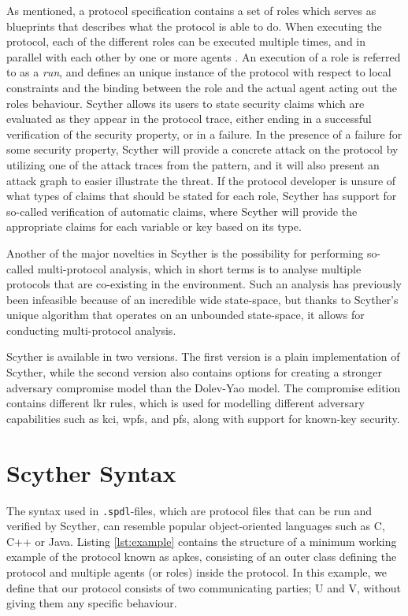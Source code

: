 As mentioned, a protocol specification contains a set of roles which serves as blueprints that describes what the protocol is able to do. When executing the protocol, each of the different roles can be executed multiple times, and in parallel with each other by one or more agents \cite{cremers2006scyther}. An execution of a role is referred to as a \emph{run}, and defines an unique instance of the protocol with respect to local constraints and the binding between the role and the actual agent acting out the roles behaviour. Scyther allows its users to state security claims which are evaluated as they appear in the protocol trace, either ending in a successful verification of the security property, or in a failure. In the presence of a failure for some security property, Scyther will provide a concrete attack on the protocol by utilizing one of the attack traces from the pattern, and it will also present an attack graph to easier illustrate the  threat. If the protocol developer is unsure of what types of claims that should be stated for each role, Scyther has support for so-called verification of automatic claims, where Scyther will provide the appropriate claims for each variable or key based on its type.

Another of the major novelties in Scyther is the possibility for performing so-called multi-protocol analysis, which in short terms is to analyse multiple protocols that are co-existing in the environment. Such an analysis has previously been infeasible because of an incredible wide state-space, but thanks to Scyther's unique algorithm that operates on an unbounded state-space, it allows for conducting multi-protocol analysis.

Scyther is available in two versions. The first version is a plain implementation of Scyther, while the second version also contains options for creating a stronger adversary compromise model than the Dolev-Yao model. The compromise edition contains different \gls{lkr} rules, which is used for modelling different adversary capabilities such as \gls{kci}, \gls{wpfs}, and \gls{pfs}, along with support for known-key security. 


\section{Scyther Syntax}


The syntax used in \verb!.spdl!-files, which are protocol files that can be run and verified by Scyther, can resemble popular object-oriented languages such as C, C++ or Java. Listing \ref{lst:example} contains the structure of a minimum working example of the protocol known as \gls{apkes}, consisting of an outer class defining the protocol and multiple agents (or roles) inside the protocol. In this example, we define that our protocol consists of two communicating parties; U and V, without giving them any specific behaviour.\newline

